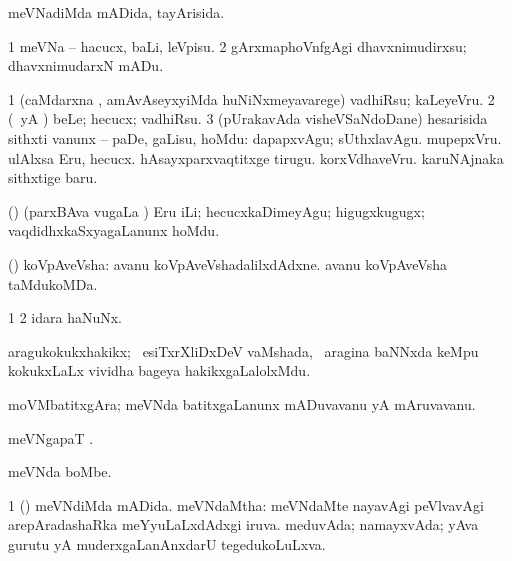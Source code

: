 {\bentry
{}
\gl{\gu}
\expl{}
\bmng
meVNadiMda mADida, tayArisida. 
\emng
\eentry

\bentry
{}
\gl{\sakirx}
\expl{}
\bmng
\bnum
\num{1} meVNa -- hacucx, baLi, leVpisu. 
\num{2} gArxmaphoVnfgAgi dhavxnimudirxsu; dhavxnimudarxN mADu. 
\enum
\emng
\eentry

\bentry
{}
\gl{\akirx}
\expl{}
\bmng
\bnum
\num{1} (caMdarxna \vi, amAvAseyxyiMda huNiNxmeyavarege) vadhiRsu; kaLeyeVru. 
\num{2} (\pArxparx\ yA \kAparx) beLe; hecucx; vadhiRsu. 
\num{3} (pUrakavAda visheVSaNdoDane) hesarisida sithxti \mo vanunx -- paDe, gaLisu, hoMdu:  dapapxvAgu; sUthxlavAgu.  mupepxVru.  ulAlxsa Eru, hecucx.  hAsayxparxvaqtitxge tirugu.  korxVdhaveVru.  karuNAjnaka sithxtige baru. 
\enum
\emng

\noindent 
\gl{\pagu}
\expl{}
\bmng
{} (\rUpa) (parxBAva \mo vugaLa \vi) Eru iLi; hecucxkaDimeyAgu; higugxkugugx; vaqdidhxkaSxyagaLanunx hoMdu. 
\emng
\eentry

\bentry
{}
\gl{\nA}
\expl{}
\bmng
(\ashi) koVpAveVsha:  avanu koVpAveVshadalilxdAdxne.  avanu koVpAveVsha taMdukoMDa. 
\emng
\eentry

\bentry
{} 
\gl{\nA}
\bmng
\bnum
\num{1}  
\num{2} idara haNuNx. 
\enum
\emng
\eentry

\bentry
{} 
\gl{\nA}
\expl{}
\bmng
aragukokukxhakikx; \kanmu\ esiTxrXliDxDeV vaMshada, \sA\ aragina baNNxda keMpu kokukxLaLx vividha bageya hakikxgaLalolxMdu. 
\emng
\eentry

\bentry
{} 
\gl{\nA}
\expl{}
\bmng
moVMbatitxgAra; meVNda batitxgaLanunx mADuvavanu yA mAruvavanu. 
\emng
\eentry

\bentry
{} 
\gl{\nA}
\expl{}
\bmng
meVNgapaT . 
\emng
\eentry

\bentry
{} 
\gl{\nA}
\expl{}
\bmng
meVNda boMbe. 
\emng
\eentry

\bentry
{} 
\gl{\gu}
\expl{}
\bmng
\bnum
\num{1} (\pArxparx) meVNdiMda mADida. 
 meVNdaMtha: 
\banum
{} meVNdaMte nayavAgi peVlvavAgi arepAradashaRka meYyuLaLxdAdxgi iruva. 
 meduvAda; namayxvAda; yAva gurutu yA muderxgaLanAnxdarU tegedukoLuLxva. 
\eanum
\numie
\enum
\emng
\eentry

}
